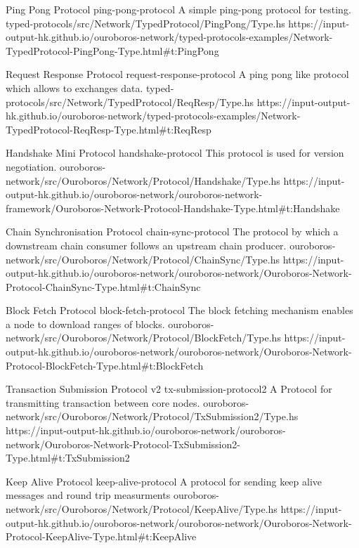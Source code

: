 \miniEntry
    {Ping Pong Protocol}
    {ping-pong-protocol}
    {A simple ping-pong protocol for testing.}
    {typed-protocols/src/Network/TypedProtocol/PingPong/Type.hs}
    {https://input-output-hk.github.io/ouroboros-network/typed-protocols-examples/Network-TypedProtocol-PingPong-Type.html\#t:PingPong}

\miniEntry
    {Request Response Protocol}
    {request-response-protocol}
    {A ping pong like protocol which allows to exchanges data.}
    {typed-protocols/src/Network/TypedProtocol/ReqResp/Type.hs}
    {https://input-output-hk.github.io/ouroboros-network/typed-protocols-examples/Network-TypedProtocol-ReqResp-Type.html\#t:ReqResp}

\miniEntry
    {Handshake Mini Protocol}
    {handshake-protocol}
    {This protocol is used for version negotiation.}
    {ouroboros-network/src/Ouroboros/Network/Protocol/Handshake/Type.hs}
    {https://input-output-hk.github.io/ouroboros-network/ouroboros-network-framework/Ouroboros-Network-Protocol-Handshake-Type.html\#t:Handshake}

\miniEntry
    {Chain Synchronisation Protocol}
    {chain-sync-protocol}
    {The protocol by which a downstream chain consumer follows an upstream chain producer.}
    {ouroboros-network/src/Ouroboros/Network/Protocol/ChainSync/Type.hs}
    {https://input-output-hk.github.io/ouroboros-network/ouroboros-network/Ouroboros-Network-Protocol-ChainSync-Type.html\#t:ChainSync}

\miniEntry
    {Block Fetch Protocol}
    {block-fetch-protocol}
    {The block fetching mechanism enables a node to download ranges of blocks.}
    {ouroboros-network/src/Ouroboros/Network/Protocol/BlockFetch/Type.hs}
    {https://input-output-hk.github.io/ouroboros-network/ouroboros-network/Ouroboros-Network-Protocol-BlockFetch-Type.html\#t:BlockFetch}

\miniEntry
    {Transaction Submission Protocol v2}
    {tx-submission-protocol2}
    {A Protocol for transmitting transaction between core nodes.}
    {ouroboros-network/src/Ouroboros/Network/Protocol/TxSubmission2/Type.hs}
    {https://input-output-hk.github.io/ouroboros-network/ouroboros-network/Ouroboros-Network-Protocol-TxSubmission2-Type.html\#t:TxSubmission2}

\miniEntry
    {Keep Alive Protocol}
    {keep-alive-protocol}
    {A protocol for sending keep alive messages and round trip measurments}
    {ouroboros-network/src/Ouroboros/Network/Protocol/KeepAlive/Type.hs}
    {https://input-output-hk.github.io/ouroboros-network/ouroboros-network/Ouroboros-Network-Protocol-KeepAlive-Type.html\#t:KeepAlive}

